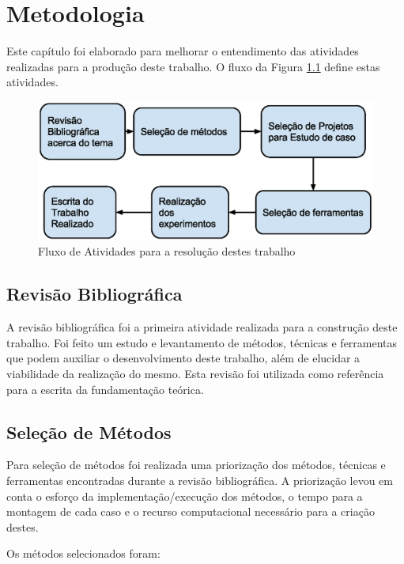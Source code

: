 \chapter[Metodologia]{Metodologia}


Este capítulo foi elaborado para melhorar o entendimento das atividades
 realizadas para a produção deste trabalho. O fluxo da Figura 
\ref{fig:fases_metodologia} define estas atividades.

\begin{figure}[h]
    \centering
        \includegraphics[keepaspectratio=true,scale=0.7]{figuras/fases_metodologia.eps}
    \caption{Fluxo de Atividades para a resolução destes trabalho}
    \label{fig:fases_metodologia}
\end{figure}


\section{Revisão Bibliográfica}

A revisão bibliográfica foi a primeira atividade realizada para a construção
 deste trabalho. Foi feito um estudo e levantamento de métodos, técnicas e
 ferramentas que podem auxiliar o desenvolvimento deste trabalho, além de
 elucidar a viabilidade da realização do mesmo. Esta revisão foi utilizada
 como referência para a  escrita da fundamentação teórica.

\section{Seleção de Métodos}

Para seleção de métodos foi realizada uma priorização dos métodos, técnicas e
 ferramentas encontradas durante a revisão bibliográfica. A priorização levou
 em conta o esforço da implementação/execução dos métodos, o tempo para a
 montagem de cada caso e o recurso computacional necessário para a criação
 destes.

Os métodos selecionados foram:

